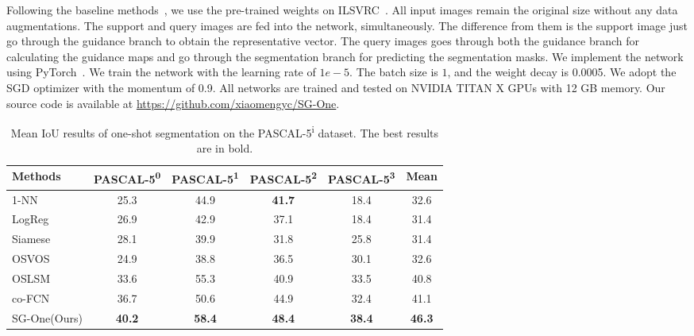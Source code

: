 \documentclass[journal]{IEEEtran}
\begin{document}
Following the baseline methods~\cite{shaban2017one,rakelly2018conditional}, we use the pre-trained weights on ILSVRC~\cite{ILSVRC15}. 
All input images remain the original size without any data augmentations. 
The support and query images are fed into the network, simultaneously.
The difference from them is the support image just go through the guidance branch to obtain the representative vector.
The query images goes through both the guidance branch for calculating the guidance maps and go through the segmentation branch for predicting the segmentation masks.
We implement the network using PyTorch~\cite{pytorch}.
We train the network with the learning rate of $1e-5$.
The batch size is $1$, and the weight decay is 0.0005.
We adopt the SGD optimizer with the momentum of 0.9.
All networks are trained and tested on NVIDIA TITAN X GPUs with 12 GB memory.
Our source code is available at \url{https://github.com/xiaomengyc/SG-One}.

\begin{table*}[ht]\setlength{\tabcolsep}{18pt}
  \centering
  \caption{Mean IoU results of one-shot segmentation on the PASCAL-5\textsuperscript{i} dataset. The best  results are in bold.}\label{comp_one}
  \begin{tabular}{l|cccc|c}
    \hline
    \hline
    \textbf{Methods\footnotemark} 
    & \textbf{PASCAL-5\textsuperscript{0}} & \textbf{PASCAL-5\textsuperscript{1}} & \textbf{PASCAL-5\textsuperscript{2}} & \textbf{PASCAL-5\textsuperscript{3}} & \textbf{Mean} \\
    \hline
    1-NN &  25.3 & 44.9 & \textbf{41.7} & 18.4  & 32.6\\
LogReg & 26.9 & 42.9 & 37.1 & 18.4 & 31.4\\
Siamese & 28.1 & 39.9 & 31.8 & 25.8 & 31.4\\
OSVOS~\cite{caelles2017one} & 24.9 & 38.8 & 36.5 & 30.1 & 32.6\\
OSLSM~\cite{shaban2017one} &  33.6 & 55.3 & 40.9 & 33.5 & 40.8\\
co-FCN~\cite{rakelly2018conditional} &  36.7  & 50.6 & 44.9 & 32.4 & 41.1 \\
SG-One(Ours) &  \textbf{40.2} & \textbf{58.4}  & \textbf{48.4}  & \textbf{38.4} & \textbf{46.3} \\
    \hline
    \hline
  \end{tabular}
  \vspace{-10pt}
\end{table*}
\end{document}
